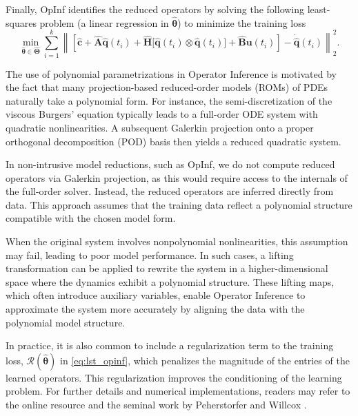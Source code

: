 \begin{enumerate}[label=\arabic*)]
Finally, OpInf identifies the reduced operators by solving the following least-squares problem (a linear regression in \(\hat{\bm{\theta}}\)) to minimize the training loss\\
\begin{equation}
    \min_{\hat{\bm{\theta}} \in \hat{\bm{\Theta}}} \sum_{i=1}^{k} \left\| \left[ \hat{\mathbf{c}} + \hat{\mathbf{A}}\hat{\mathbf{q}}(t_i) + \hat{\mathbf{H}}\bigl[ \hat{\mathbf{q}}(t_i) \otimes \hat{\mathbf{q}}(t_i) \bigr] + \hat{\mathbf{B}}\mathbf{u}(t_i) \right] - \dot{\hat{\mathbf{q}}}(t_i) \right\|_2^2.
    \label{eq:lst_opinf}
\end{equation}

The use of polynomial parametrizations in Operator Inference is motivated by the fact that many projection-based reduced-order models (ROMs) of PDEs naturally take a polynomial form. For instance, the semi-discretization of the viscous Burgers' equation typically leads to a full-order ODE system with quadratic nonlinearities. A subsequent Galerkin projection onto a proper orthogonal decomposition (POD) basis then yields a reduced quadratic system.

In non-intrusive model reductions, such as OpInf, we do not compute reduced operators via Galerkin projection, as this would require access to the internals of the full-order solver. Instead, the reduced operators are inferred directly from data. This approach assumes that the training data reflect a polynomial structure compatible with the chosen model form.

When the original system involves nonpolynomial nonlinearities, this assumption may fail, leading to poor model performance. In such cases, a lifting transformation can be applied to rewrite the system in a higher-dimensional space where the dynamics exhibit a polynomial structure. These lifting maps, which often introduce auxiliary variables, enable Operator Inference to approximate the system more accurately by aligning the data with the polynomial model structure.

In practice, it is also common to include a regularization term to the training loss, $\mathcal{R}(\hat{\bm{\theta}})$ in \eqref{eq:lst_opinf}, which penalizes the magnitude of the entries of the learned operators. This regularization improves the conditioning of the learning problem. For further details and numerical implementations, readers may refer to the online resource \cite{opinf2025} and the seminal work by Peherstorfer and Willcox \cite{peherstorfer2016data}.
\end{enumerate}

